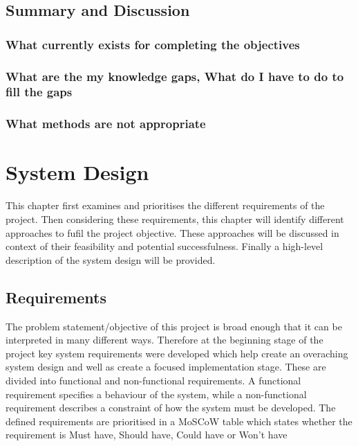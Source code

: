 \documentclass{mproj}
\begin{document}
\section{Summary and Discussion}
\subsection{What currently exists for completing the objectives}
\subsection{What are the my knowledge gaps, What do I have to do to fill the gaps}
\subsection{What methods are not appropriate}

\chapter{System Design}

This chapter first examines and prioritises the different requirements of the project. Then considering these requirements, this chapter will identify different approaches to fufil the project objective. These approaches will be discussed in context of their feasibility and potential successfulness. Finally a high-level description of the system design will be provided. 

\section{Requirements}
 
The problem statement/objective of this project is broad enough that it can be interpreted in many different ways. Therefore at the beginning stage of the project key system requirements were developed which help create an overaching system design and well as create a focused implementation stage. These are divided into functional and non-functional requirements. A functional requirement specifies a behaviour of the system, while a non-functional requirement describes a constraint of how the system must be developed. The defined requirements are prioritised in a MoSCoW table which states whether the requirement is Must have, Should have, Could have or Won’t have
\end{document}
